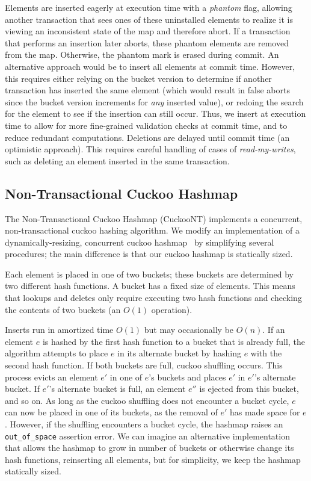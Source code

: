 Elements are inserted eagerly at execution time with a \emph{phantom} flag, allowing another transaction that sees ones of these uninstalled elements to realize it is viewing an inconsistent state of the map and therefore abort. If a transaction that performs an insertion later aborts, these phantom elements are removed from the map. Otherwise, the phantom mark is erased during commit. An alternative approach would be to insert all elements at commit time. However, this requires either relying on the bucket version to determine if another transaction has inserted the same element (which would result in false aborts since the bucket version increments for \emph{any} inserted value), or redoing the search for the element to see if the insertion can still occur. Thus, we insert at execution time to allow for more fine-grained validation checks at commit time, and to reduce redundant computations. Deletions are delayed until commit time (an optimistic approach). This requires careful handling of cases of \emph{read-my-writes}, such as deleting an element inserted in the same transaction.

\subsection{Non-Transactional Cuckoo Hashmap}
\label{section:ntchm_algo}
The Non-Transactional Cuckoo Hashmap (CuckooNT) implements a concurrent, non-transactional cuckoo hashing algorithm. We modify an implementation of a dynamically-resizing, concurrent cuckoo hashmap~\cite{cuckoocode} by simplifying several procedures; the main difference is that our cuckoo hashmap is statically sized.

Each element is placed in one of two buckets; these buckets are determined by two different hash functions. A bucket has a fixed size of elements. This means that lookups and deletes only require executing two hash functions and checking the contents of two buckets (an $O(1)$ operation).

Inserts run in amortized time $O(1)$ but may occasionally be $O(n)$.
If an element $e$ is hashed by the first hash function to a bucket that is already full, the algorithm attempts to place $e$ in its alternate bucket by hashing $e$ with the second hash function. If both buckets are full, cuckoo shuffling occurs. This process evicts an element $e'$ in one of $e$'s buckets and places $e'$ in $e'$'s alternate bucket. If $e'$'s alternate bucket is full, an element $e''$ is ejected from this bucket, and so on. As long as the cuckoo shuffling does not encounter a bucket cycle, $e$ can now be placed in one of its buckets, as the removal of $e'$ has made space for $e$.
However, if the shuffling encounters a bucket cycle, the hashmap raises an \texttt{{out\_of\_space}} assertion error. We can imagine an alternative implementation that allows the hashmap to grow in number of buckets or otherwise change its hash functions, reinserting all elements, but for simplicity, we keep the hashmap statically sized.

